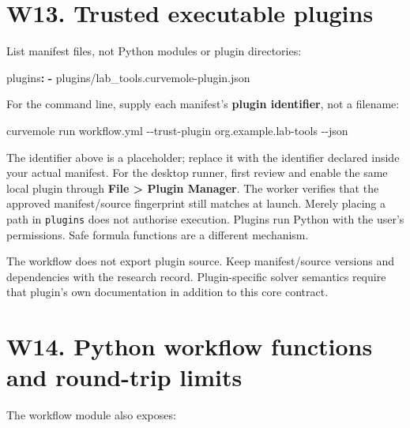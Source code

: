 \documentclass[
  10pt,
  a4paper,
  oneside]{scrreprt}
\newenvironment{Shaded}{}{}
\newcommand{\AttributeTok}[1]{\textcolor[rgb]{0.49,0.56,0.16}{#1}}
\newcommand{\ExtensionTok}[1]{#1}
\newcommand{\FunctionTok}[1]{\textcolor[rgb]{0.02,0.16,0.49}{#1}}
\newcommand{\KeywordTok}[1]{\textcolor[rgb]{0.00,0.44,0.13}{\textbf{#1}}}
\newcommand{\NormalTok}[1]{#1}
\begin{document}
\hypertarget{w13.-trusted-executable-plugins}{%
\section{W13. Trusted executable
plugins}\label{w13.-trusted-executable-plugins}}

List manifest files, not Python modules or plugin directories:

\begin{Shaded}
\begin{Highlighting}[]
\FunctionTok{plugins}\KeywordTok{:}
\AttributeTok{  }\KeywordTok{{-}}\AttributeTok{ plugins/lab\_tools.curvemole{-}plugin.json}
\end{Highlighting}
\end{Shaded}

For the command line, supply each manifest's \textbf{plugin identifier},
not a filename:

\begin{Shaded}
\begin{Highlighting}[]
\ExtensionTok{curvemole}\NormalTok{ run workflow.yml {-}{-}trust{-}plugin org.example.lab{-}tools {-}{-}json}
\end{Highlighting}
\end{Shaded}

The identifier above is a placeholder; replace it with the identifier
declared inside your actual manifest. For the desktop runner, first
review and enable the same local plugin through \textbf{File
\textgreater{} Plugin Manager}. The worker verifies that the approved
manifest/source fingerprint still matches at launch. Merely placing a
path in \texttt{plugins} does not authorise execution. Plugins run
Python with the user's permissions. Safe formula functions are a
different mechanism.

The workflow does not export plugin source. Keep manifest/source
versions and dependencies with the research record. Plugin-specific
solver semantics require that plugin's own documentation in addition to
this core contract.

\hypertarget{w14.-python-workflow-functions-and-round-trip-limits}{%
\section{W14. Python workflow functions and round-trip
limits}\label{w14.-python-workflow-functions-and-round-trip-limits}}

The workflow module also exposes:
\end{document}
